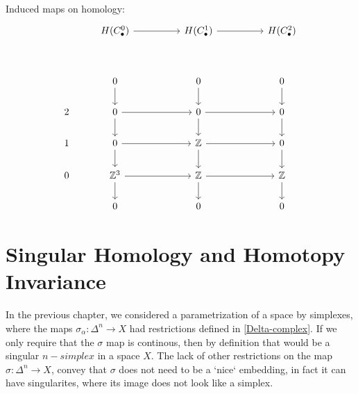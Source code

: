 \documentclass[11pt,a4paper]{report}
\begin{document}
        Induced maps on homology:
       \[             
     \begin{tikzcd}[ampersand replacement=\&]
            \& H(C_\bullet^0)   \arrow[rr]                                     \&  \& H(C_\bullet^1) \arrow[rr]                               \&  \& H(C_\bullet^2)                                                                 \\ \\
            \& 0 \arrow[d]                                         \&  \& 0 \arrow[d]                                         \&  \& 0 \arrow[d]                                                                 \\ 
            2 \& 0 \arrow[rr] \arrow[d]            \&  \& 0 \arrow[rr] \arrow[d]            \&  \& 0 \arrow[d] \\
            1 \& 0 \arrow[d] \arrow[rr]            \&  \& \mathbb{Z} \arrow[rr] \arrow[d]                   \&  \& 0 \arrow[d]                                              \\
            0 \& \mathbb{Z}^3 \arrow[d] \arrow[rr] \&  \& \mathbb{Z} \arrow[rr] \arrow[d] \&  \& \mathbb{Z} \arrow[d]                                    \\
            \& 0                                                   \&  \& 0                                                   \&  \& 0                                                                          
    \end{tikzcd}
         \]           
                    
     \chapter{Singular Homology and Homotopy Invariance}
        \label{SingularHomology}
     
     
     In the previous chapter, we considered a parametrization of a space by simplexes, where the maps $\sigma_\alpha: \Delta^n \rightarrow X$ had restrictions defined in \ref{Delta-complex}. If we only require that the $\sigma$ map is continous, then by definition that would be a singular $n-simplex$ in a space $X$.
     The lack of other restrictions on the map $\sigma: \Delta^n \rightarrow X$, convey that $\sigma$ does not need to be a `nice` embedding, in fact it can have singularites, where its image does not look like a simplex.
     
\end{document}
